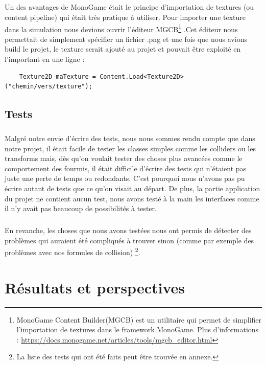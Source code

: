 \documentclass{EPUProjetDi}
\begin{document}
\paragraph{}
Un des avantages de MonoGame était le principe d'importation de textures (ou content pipeline) qui était très pratique à utiliser. Pour importer une texture dans la simulation nous devions ouvrir l'éditeur 
MGCB\footnote{MonoGame Content Builder(MGCB) est un utilitaire qui permet de simplifier l'importation de textures dans le framework MonoGame. Plus d'informations : \url{https://docs.monogame.net/articles/tools/mgcb_editor.html}}
.Cet éditeur nous permettait de simplement spécifier un fichier .png et une fois que nous avions build le projet, le texture serait ajouté au projet et pouvait être exploité en l'important en une ligne : 
\begin{verbatim}
    Texture2D maTexture = Content.Load<Texture2D>("chemin/vers/texture");
\end{verbatim}

\section{Tests}

\paragraph{}
Malgré notre envie d'écrire des tests, nous nous sommes rendu compte que dans notre projet, il était facile de tester les classes simples comme les colliders ou les transforms
mais, dès qu'on voulait tester des choses plus avancées comme le comportement des fourmis, il était difficile d'écrire des tests qui n'étaient pas juste une perte de temps ou redondants.
C'est pourquoi nous n'avons pas pu écrire autant de tests que ce qu'on visait au départ. De plus, la partie application du projet ne contient aucun test, nous avons testé à la main les interfaces comme il n'y
avait pas beaucoup de possibilités à tester.

\paragraph{}
En revanche, les choses que nous avons testées nous ont permis de détecter des problèmes qui auraient été compliqués à trouver sinon (comme par exemple des problèmes avec nos formules de collision)
\footnote{La liste des tests qui ont été faits peut être trouvée en annexe.}.

\chapter{Résultats et perspectives}
\end{document}
